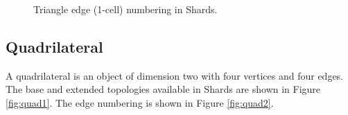 \documentclass[pdf,12pt,relaxed]{SANDreport}
\begin{document}
\begin{figure}[ht]
  \begin{center}
  \end{center}
 \caption{Triangle edge (1-cell) numbering in Shards.}
\label{fig:tri2}
\end{figure}


\subsection{Quadrilateral}
A quadrilateral is an object of dimension two with four vertices and four edges. The base and extended topologies available in Shards are shown in Figure \ref{fig:quad1}. The edge numbering is shown in Figure \ref{fig:quad2}.
\end{document}
